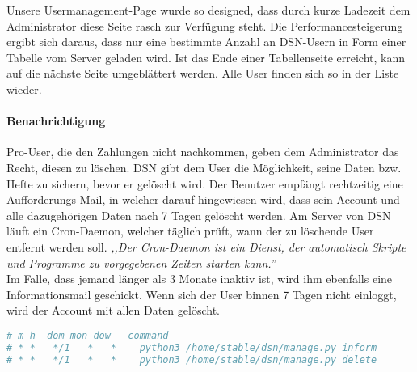 Unsere Usermanagement-Page wurde so designed, dass durch kurze Ladezeit dem Administrator diese Seite rasch zur Verfügung steht. Die Performancesteigerung ergibt sich daraus, dass nur eine bestimmte Anzahl an DSN-Usern in Form einer Tabelle vom Server geladen wird. Ist das Ende einer Tabellenseite erreicht, kann auf die nächste Seite umgeblättert werden. Alle User finden sich so in der Liste wieder.

\paragraph{Benachrichtigung}
Pro-User, die den Zahlungen nicht nachkommen, geben dem Administrator das Recht, diesen zu löschen. DSN gibt dem User die Möglichkeit, seine Daten bzw. Hefte zu sichern, bevor er gelöscht wird. Der Benutzer empfängt rechtzeitig eine Aufforderungs-Mail, in welcher darauf hingewiesen wird, dass sein Account und alle dazugehörigen Daten nach 7 Tagen gelöscht werden. Am Server von DSN läuft ein Cron-Daemon, welcher täglich prüft, wann der zu löschende User entfernt werden soll. \textit{,,Der Cron-Daemon ist ein Dienst, der automatisch Skripte und Programme zu vorgegebenen Zeiten starten kann.''}\cite{CRON}\\
Im Falle, dass jemand länger als 3 Monate inaktiv ist, wird ihm ebenfalls eine Informationsmail geschickt. Wenn sich der User binnen 7 Tagen nicht einloggt, wird der Account mit allen Daten gelöscht. \cite{COMMANDS}\cite{CRON}

\begin{lstlisting}[caption={Cronjob für die {\"U}berpr{\"u}fung der Inaktivit{\"a}t und L{\"o}schung}, language=bash]
# m h  dom mon dow   command
# * *   */1   *   *    python3 /home/stable/dsn/manage.py inform
# * *   */1   *   *    python3 /home/stable/dsn/manage.py delete
\end{lstlisting}